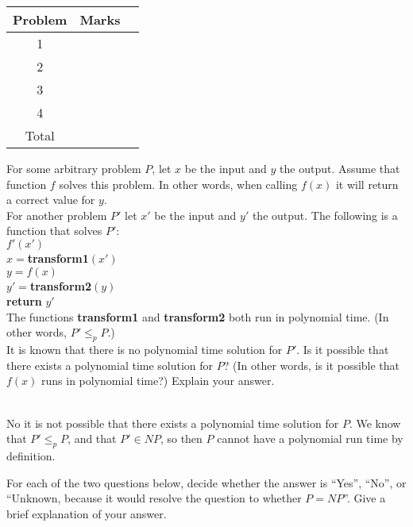 \documentclass{assignment}
\begin{document}
\begin{center}
\renewcommand{\arraystretch}{2}
\begin{tabular}{|c|c|c|} \hline
Problem & Marks \\ \hline \hline
1 & \\ \hline
2 & \\ \hline
3 & \\ \hline
4 & \\ \hline
Total & \\ \hline
\end{tabular}
\end{center}

\bigskip

\begin{problemlist}

\clearpage
\pbitem
\begin{problem}
For some arbitrary problem $P$, let $x$ be the input and $y$ the output. Assume that function $f$ solves this problem. In other words, when calling $f(x)$ it will return a correct value for $y$.\\
For another problem $P'$ let $x'$ be the input and $y'$ the output. The following is a function that solves $P'$:\\
$f'(x')$\\
$x=$\textbf{transform1}$(x')$\\
$y=f(x)$\\
$y'=$\textbf{transform2}$(y)$\\
\textbf{return} $y'$\\
The functions \textbf{transform1} and \textbf{transform2} both run in polynomial time. (In other words, $P' \le_p P$.)\\
It is known that there is no polynomial time solution for $P'$. Is it possible that there exists a polynomial time solution for $P$? (In other words, is it possible that $f(x)$ runs in polynomial time?) Explain your answer.
\end{problem}
\begin{answer}
\\
No it is not possible that there exists a polynomial time solution for $P$. We know that $P' \le_p P$, and that $P'\in NP$, so then $P$ cannot have a polynomial run time by definition.
\end{answer}
\clearpage
\pbitem
\begin{problem}
For each of the two questions below, decide whether the answer is ``Yes'', ``No'', or ``Unknown, because it would resolve the question to whether $P=NP$''. Give a brief explanation of your answer.

\end{problem}
\end{problemlist}
\end{document}
